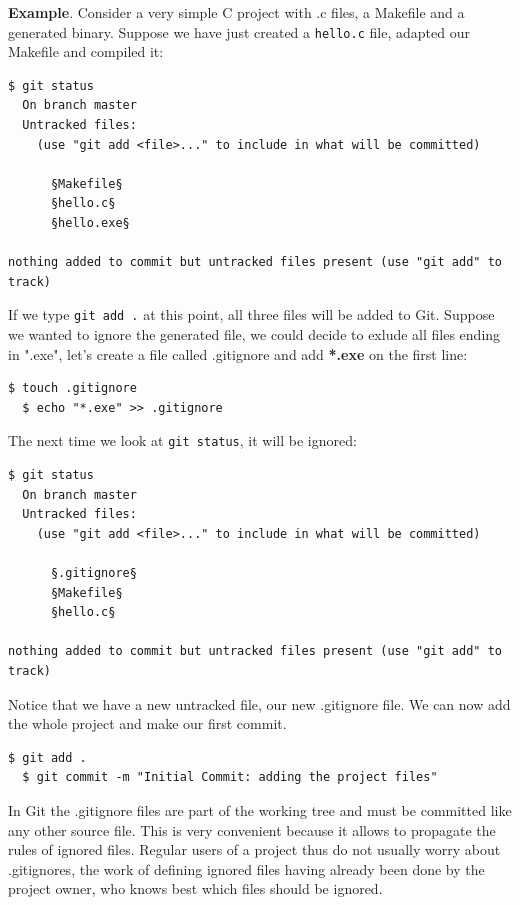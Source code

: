 \documentclass{../common/tufte-latex/tufte-handout}
\begin{document}
\noindent \textbf{Example}.
Consider a very simple C project with .c files, a Makefile and a generated binary.
Suppose we have just created a \texttt{hello.c} file, adapted our Makefile and compiled it:

\begin{lstlisting}[style=BashInputStyle]
  $ git status
  On branch master
  Untracked files:
    (use "git add <file>..." to include in what will be committed)
  
      §Makefile§
      §hello.c§
      §hello.exe§

nothing added to commit but untracked files present (use "git add" to track)
\end{lstlisting}

If we type \texttt{git add .} at this point, all three files will be added to Git.
Suppose we wanted to ignore the generated file, we could decide to exlude all files ending in ".exe", let's create a file called .gitignore and add \textbf{*.exe} on the first line:
\begin{lstlisting}[style=BashInputStyle]
  $ touch .gitignore
  $ echo "*.exe" >> .gitignore
\end{lstlisting}

The next time we look at \texttt{git status}, it will be ignored:
\begin{lstlisting}[style=BashInputStyle]
  $ git status
  On branch master
  Untracked files:
    (use "git add <file>..." to include in what will be committed)
  
      §.gitignore§
      §Makefile§
      §hello.c§

nothing added to commit but untracked files present (use "git add" to track)
\end{lstlisting}

Notice that we have a new untracked file, our new .gitignore file.
We can now add the whole project and make our first commit.

\begin{lstlisting}[style=BashInputStyle]
  $ git add .
  $ git commit -m "Initial Commit: adding the project files"
\end{lstlisting}

In Git the .gitignore files are part of the working tree and must be committed like any other source file.
This is very convenient because it allows to propagate the rules of ignored files.
Regular users of a project thus do not usually worry about .gitignores, the work of defining ignored files having already been done by the project owner, who knows best which files should be ignored.
\end{document}
